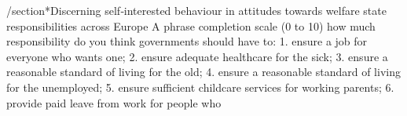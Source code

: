 /section*{Discerning self‐interested behaviour in attitudes towards welfare state responsibilities across Europe \cite{baslevent_discerning_2011}}
A phrase completion scale (0 to 10)
 how much responsibility do you think governments should have to:
 1. ensure a job for everyone who wants one; 
 2. ensure adequate healthcare for the sick;
 3.  ensure a reasonable standard of living for the old; 
 4.  ensure a reasonable standard of living for the unemployed;
 5.  ensure sufficient childcare services for working parents; 
 6.  provide paid leave from work for people who
